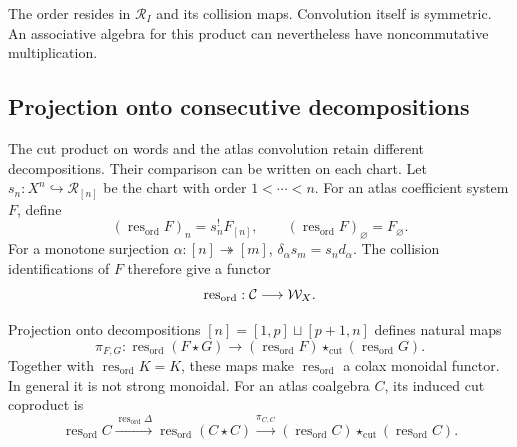 The order resides in \(\mathscr R_I\) and its collision maps.
Convolution itself is symmetric.
An associative algebra for this product can nevertheless have noncommutative multiplication.

\subsection{Projection onto consecutive decompositions}
\label{ogd:sec:atlas-cut-comparison}

The cut product on words and the atlas convolution retain different
decompositions. Their comparison can be written on each chart.
Let\label{ogd:def:increasing-chart-restriction} $s_n:X^n\hookrightarrow\mathscr R_{[n]}$ be the chart with order
$1<\cdots<n$. For an atlas coefficient system $F$, define
\[
 (\operatorname{res}_{\mathrm{ord}}F)_n=s_n^!F_{[n]},\qquad
 (\operatorname{res}_{\mathrm{ord}}F)_\varnothing=F_\varnothing.
\]
For a monotone surjection $\alpha:[n]\twoheadrightarrow[m]$,
$\delta_\alpha s_m=s_nd_\alpha$.
The collision identifications of $F$ therefore give a functor
\[
 \operatorname{res}_{\mathrm{ord}}:\mathcal C\longrightarrow\mathcal W_X.
\]

\begin{proposition}
\label{ogd:prop:atlas-cut-projection}
Projection onto decompositions
$[n]=[1,p]\sqcup[p+1,n]$ defines natural maps
\begin{equation}\label{ogd:eq:atlas-cut-projection}
 \pi_{F,G}:\operatorname{res}_{\mathrm{ord}}(F\star G)
 \longrightarrow
 (\operatorname{res}_{\mathrm{ord}}F)
       \star_{\mathrm{cut}}(\operatorname{res}_{\mathrm{ord}}G).
\end{equation}
Together with $\operatorname{res}_{\mathrm{ord}}K=K$, these maps make
$\operatorname{res}_{\mathrm{ord}}$ a colax monoidal functor.
In general it is not strong monoidal.
For an atlas coalgebra $C$, its induced cut coproduct is
\[
 \operatorname{res}_{\mathrm{ord}}C
 \xrightarrow{\operatorname{res}_{\mathrm{ord}}\Delta}
 \operatorname{res}_{\mathrm{ord}}(C\star C)
 \xrightarrow{\pi_{C,C}}
 (\operatorname{res}_{\mathrm{ord}}C)
       \star_{\mathrm{cut}}(\operatorname{res}_{\mathrm{ord}}C).
\]
\end{proposition}

